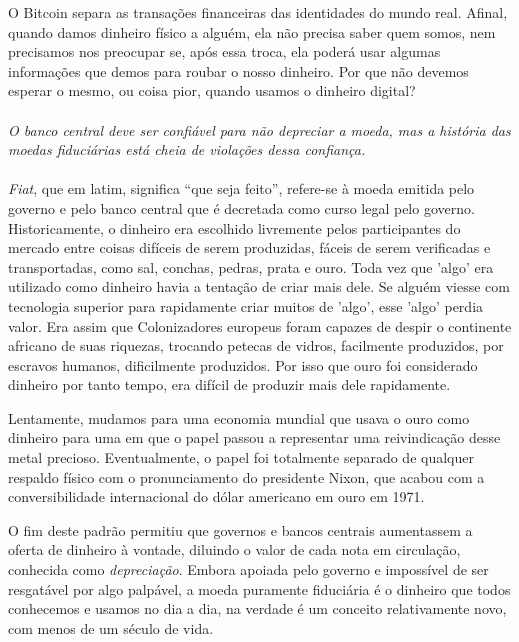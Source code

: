O Bitcoin separa as transações financeiras das identidades do mundo real. Afinal, quando damos dinheiro físico a alguém, ela não precisa saber quem somos, nem precisamos nos preocupar se, após essa troca, ela poderá usar algumas informações que demos para roubar o nosso dinheiro. Por que não devemos esperar o mesmo, ou coisa pior, quando usamos o dinheiro digital?

\paragraph{}
\textit{O banco central deve ser confiável para não depreciar a moeda, mas a história das moedas fiduciárias está cheia de violações dessa confiança.}
\paragraph{}

\textit{Fiat}, que em latim, significa “que seja feito”, refere-se à moeda emitida pelo governo e pelo banco central que é decretada como curso legal pelo governo. Historicamente, o dinheiro era escolhido livremente pelos participantes do mercado entre coisas difíceis de serem produzidas, fáceis de serem verificadas e transportadas, como sal, conchas, pedras, prata e ouro.
Toda vez que 'algo' era utilizado como dinheiro havia a tentação de criar mais dele. Se alguém viesse com tecnologia superior para rapidamente criar muitos de 'algo', esse 'algo' perdia valor. Era assim que Colonizadores europeus foram capazes de despir o continente africano de suas riquezas, trocando petecas de vidros, facilmente produzidos, por escravos humanos, dificilmente produzidos. Por isso que ouro foi considerado dinheiro por tanto tempo, era difícil de produzir mais dele rapidamente.

Lentamente, mudamos para uma economia mundial que usava o ouro como dinheiro para uma em que o papel passou a representar uma reivindicação desse metal precioso. Eventualmente, o papel foi totalmente separado de qualquer respaldo físico com o pronunciamento do presidente Nixon, que acabou com a conversibilidade internacional do dólar americano em ouro em 1971. 

O fim deste padrão permitiu que governos e bancos centrais aumentassem a oferta de dinheiro à vontade, diluindo o valor de cada nota em circulação, conhecida como \textit{depreciação}. Embora apoiada pelo governo e impossível de ser resgatável por algo palpável, a moeda puramente fiduciária é o dinheiro que todos conhecemos e usamos no dia a dia, na verdade é um conceito relativamente novo, com menos de um século de vida.

